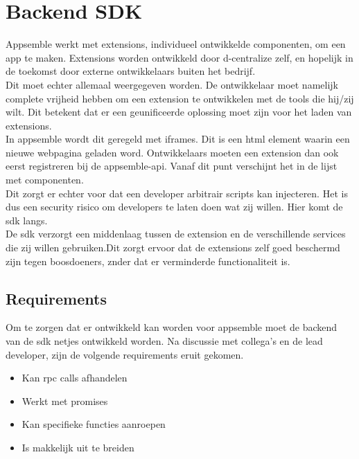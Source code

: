 \chapter{Backend SDK}

Appsemble werkt met extensions, individueel ontwikkelde componenten, om een app te maken. Extensions worden ontwikkeld door d-centralize zelf, en hopelijk in de toekomst door externe ontwikkelaars buiten het bedrijf. \\

Dit moet echter allemaal weergegeven worden. De ontwikkelaar moet namelijk complete vrijheid hebben om een extension te ontwikkelen met de tools die hij/zij wilt. Dit betekent dat er een geunificeerde oplossing moet zijn voor het laden van extensions. \\ 

In appsemble wordt dit geregeld met iframes. Dit is een html element waarin een nieuwe webpagina geladen word. Ontwikkelaars moeten een extension dan ook eerst registreren bij de appsemble-api. Vanaf dit punt verschijnt het in de lijst met componenten. \\

Dit zorgt er echter voor dat een developer arbitrair scripts kan injecteren. Het is dus een security risico om developers te laten doen wat zij willen. Hier komt de sdk langs. \\

De sdk verzorgt een middenlaag tussen de extension en de verschillende services die zij willen gebruiken.Dit zorgt ervoor dat de extensions zelf goed beschermd zijn tegen boosdoeners, znder dat er verminderde functionaliteit is.

\section{Requirements}

Om te zorgen dat er ontwikkeld kan worden voor appsemble moet de backend van de sdk netjes ontwikkeld worden. Na discussie met collega's en de lead developer, zijn de volgende requirements eruit gekomen.

\begin{itemize}
	\item Kan rpc calls afhandelen
	\item Werkt met promises
	\item Kan specifieke functies aanroepen
	\item Is makkelijk uit te breiden
\end{itemize}


